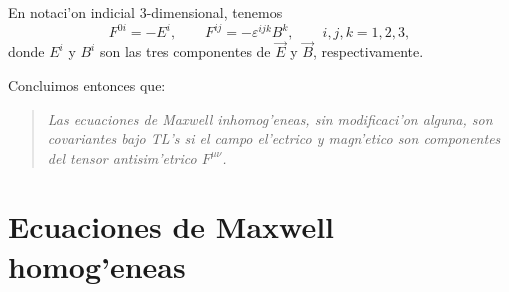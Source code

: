 En notaci'on indicial 3-dimensional, tenemos
\begin{equation}
F^{0i}   =-E^i, \qquad F^{ij}   =-\varepsilon^{ijk}B^{k}, \qquad i,j,k=1,2,3,
\end{equation}
donde $E^i$ y $B^i$ son las tres componentes de $\vec{E}$ y $\vec{B}$, respectivamente.

Concluimos entonces que:
\begin{quotation}
\textit{Las ecuaciones de Maxwell inhomog'eneas, sin modificaci'on alguna, son covariantes bajo TL's si el campo el'ectrico y magn'etico son componentes del
tensor antisim'etrico $F^{\mu \nu}$.}
\end{quotation}

\section{Ecuaciones de Maxwell homog'eneas}

